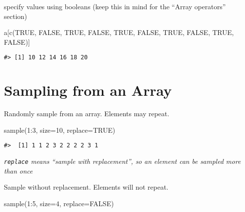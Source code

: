 \documentclass[
]{book}
\newenvironment{Shaded}{\begin{snugshade}}{\end{snugshade}}
\newcommand{\AttributeTok}[1]{\textcolor[rgb]{0.77,0.63,0.00}{#1}}
\newcommand{\ConstantTok}[1]{\textcolor[rgb]{0.00,0.00,0.00}{#1}}
\newcommand{\DecValTok}[1]{\textcolor[rgb]{0.00,0.00,0.81}{#1}}
\newcommand{\FunctionTok}[1]{\textcolor[rgb]{0.00,0.00,0.00}{#1}}
\newcommand{\NormalTok}[1]{#1}
\newcommand{\SpecialCharTok}[1]{\textcolor[rgb]{0.00,0.00,0.00}{#1}}
\begin{document}
specify values using booleans (keep this in mind for the ``Array operators'' section)

\begin{Shaded}
\begin{Highlighting}[]
\NormalTok{a[}\FunctionTok{c}\NormalTok{(}\ConstantTok{TRUE}\NormalTok{, }\ConstantTok{FALSE}\NormalTok{, }\ConstantTok{TRUE}\NormalTok{, }\ConstantTok{FALSE}\NormalTok{, }\ConstantTok{TRUE}\NormalTok{, }\ConstantTok{FALSE}\NormalTok{, }\ConstantTok{TRUE}\NormalTok{, }\ConstantTok{FALSE}\NormalTok{, }\ConstantTok{TRUE}\NormalTok{, }\ConstantTok{FALSE}\NormalTok{)]}
\end{Highlighting}
\end{Shaded}

\begin{verbatim}
#> [1] 10 12 14 16 18 20
\end{verbatim}

\hypertarget{sampling-from-an-array}{%
\section{Sampling from an Array}\label{sampling-from-an-array}}

Randomly sample from an array. Elements may repeat.

\begin{Shaded}
\begin{Highlighting}[]
\FunctionTok{sample}\NormalTok{(}\DecValTok{1}\SpecialCharTok{:}\DecValTok{3}\NormalTok{, }\AttributeTok{size=}\DecValTok{10}\NormalTok{, }\AttributeTok{replace=}\ConstantTok{TRUE}\NormalTok{)}
\end{Highlighting}
\end{Shaded}

\begin{verbatim}
#>  [1] 1 1 2 3 2 2 2 2 3 1
\end{verbatim}

\emph{\texttt{replace} means ``sample with replacement'', so an element can be sampled more than once}

Sample without replacement. Elements will not repeat.

\begin{Shaded}
\begin{Highlighting}[]
\FunctionTok{sample}\NormalTok{(}\DecValTok{1}\SpecialCharTok{:}\DecValTok{5}\NormalTok{, }\AttributeTok{size=}\DecValTok{4}\NormalTok{, }\AttributeTok{replace=}\ConstantTok{FALSE}\NormalTok{)}
\end{Highlighting}
\end{Shaded}
\end{document}
